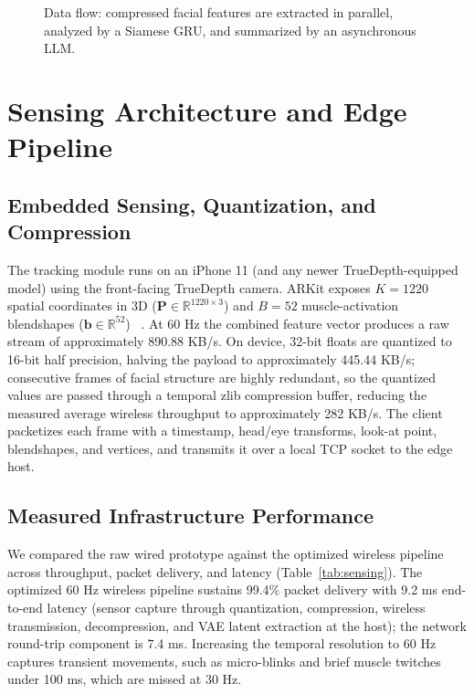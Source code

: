 \documentclass[sigconf]{acmart}
\begin{document}
\begin{figure}[h]
  \caption{Data flow: compressed facial features are extracted in parallel,
  analyzed by a Siamese GRU, and summarized by an asynchronous LLM.}
  \label{fig:pipeline}
\end{figure}

\section{Sensing Architecture and Edge Pipeline}
\label{sec:sensing}

\subsection{Embedded Sensing, Quantization, and Compression}
The tracking module runs on an iPhone 11 (and any newer TrueDepth-equipped
model) using the front-facing TrueDepth camera. ARKit exposes $K = 1220$ spatial
coordinates in 3D ($\mathbf{P} \in \mathbb{R}^{1220 \times 3}$) and $B = 52$
muscle-activation blendshapes ($\mathbf{b} \in \mathbb{R}^{52}$)
~\cite{apple2026arkit}. At 60 Hz the combined feature vector produces a raw
stream of approximately 890.88 KB/s. On device, 32-bit floats are quantized to
16-bit half precision, halving the payload to approximately 445.44 KB/s;
consecutive frames of facial structure are highly redundant, so the quantized
values are passed through a temporal zlib compression buffer, reducing the
measured average wireless throughput to approximately 282 KB/s. The client
packetizes each frame with a timestamp, head/eye transforms, look-at point,
blendshapes, and vertices, and transmits it over a local TCP socket to the edge
host.

\subsection{Measured Infrastructure Performance}
We compared the raw wired prototype against the optimized wireless pipeline
across throughput, packet delivery, and latency (Table~\ref{tab:sensing}).
The optimized 60 Hz wireless pipeline sustains 99.4\% packet delivery with
9.2 ms end-to-end latency (sensor capture through quantization, compression,
wireless transmission, decompression, and VAE latent extraction at the host);
the network round-trip component is 7.4 ms. Increasing the temporal resolution
to 60 Hz captures transient movements, such as micro-blinks and brief muscle
twitches under 100 ms, which are missed at 30 Hz.
\end{document}
